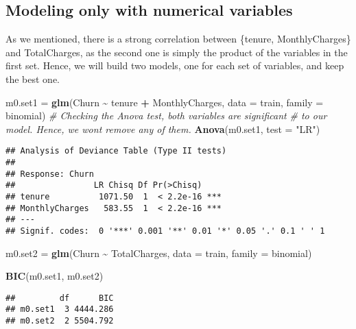 \documentclass[
]{article}
\newenvironment{Shaded}{\begin{snugshade}}{\end{snugshade}}
\newcommand{\AttributeTok}[1]{\textcolor[rgb]{0.13,0.29,0.53}{#1}}
\newcommand{\CommentTok}[1]{\textcolor[rgb]{0.56,0.35,0.01}{\textit{#1}}}
\newcommand{\FunctionTok}[1]{\textcolor[rgb]{0.13,0.29,0.53}{\textbf{#1}}}
\newcommand{\NormalTok}[1]{#1}
\newcommand{\OtherTok}[1]{\textcolor[rgb]{0.56,0.35,0.01}{#1}}
\newcommand{\SpecialCharTok}[1]{\textcolor[rgb]{0.81,0.36,0.00}{\textbf{#1}}}
\newcommand{\StringTok}[1]{\textcolor[rgb]{0.31,0.60,0.02}{#1}}
\begin{document}
\hypertarget{modeling-only-with-numerical-variables}{%
\subsection{Modeling only with numerical
variables}\label{modeling-only-with-numerical-variables}}

As we mentioned, there is a strong correlation between \{tenure,
MonthlyCharges\} and TotalCharges, as the second one is simply the
product of the variables in the first set. Hence, we will build two
models, one for each set of variables, and keep the best one.

\begin{Shaded}
\begin{Highlighting}[]
\NormalTok{m0.set1 }\OtherTok{=} \FunctionTok{glm}\NormalTok{(Churn }\SpecialCharTok{\textasciitilde{}}\NormalTok{ tenure }\SpecialCharTok{+}\NormalTok{ MonthlyCharges, }\AttributeTok{data =}\NormalTok{ train,}
    \AttributeTok{family =}\NormalTok{ binomial)}
\CommentTok{\# Checking the Anova test, both variables are significant}
\CommentTok{\# to our model. Hence, we won\textquotesingle{}t remove any of them.}
\FunctionTok{Anova}\NormalTok{(m0.set1, }\AttributeTok{test =} \StringTok{"LR"}\NormalTok{)}
\end{Highlighting}
\end{Shaded}

\begin{verbatim}
## Analysis of Deviance Table (Type II tests)
## 
## Response: Churn
##                LR Chisq Df Pr(>Chisq)    
## tenure          1071.50  1  < 2.2e-16 ***
## MonthlyCharges   583.55  1  < 2.2e-16 ***
## ---
## Signif. codes:  0 '***' 0.001 '**' 0.01 '*' 0.05 '.' 0.1 ' ' 1
\end{verbatim}

\begin{Shaded}
\begin{Highlighting}[]
\NormalTok{m0.set2 }\OtherTok{=} \FunctionTok{glm}\NormalTok{(Churn }\SpecialCharTok{\textasciitilde{}}\NormalTok{ TotalCharges, }\AttributeTok{data =}\NormalTok{ train, }\AttributeTok{family =}\NormalTok{ binomial)}

\FunctionTok{BIC}\NormalTok{(m0.set1, m0.set2)}
\end{Highlighting}
\end{Shaded}

\begin{verbatim}
##         df      BIC
## m0.set1  3 4444.286
## m0.set2  2 5504.792
\end{verbatim}
\end{document}
